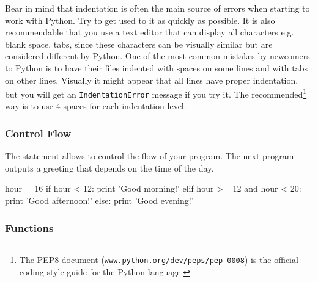 \noindent Bear in mind that indentation is often the main source of errors when starting to work with Python. Try to get used to it as quickly as possible. It is also recommendable that you use a text editor that can display all characters e.g. blank space, tabs, since these characters can be visually similar but are considered different by Python. One of the most common mistakes by newcomers to Python is to have their files indented with spaces on some lines and with tabs on other lines. Visually it might appear that all lines have proper indentation, but you will get an \texttt{IndentationError} message if you try it. The recommended\footnote{The PEP8 document (\texttt{www.python.org/dev/peps/pep-0008}) is the official coding style guide for the Python language.} way is to use 4 spaces for each indentation level.



\subsubsection{Control Flow}

The  statement allows to control the flow of your program. The next program outputs a greeting that depends on the time of the day.

\begin{python}
hour = 16
if hour < 12:
    print 'Good morning!'
elif hour >= 12 and hour < 20:
    print 'Good afternoon!'
else:
    print 'Good evening!'
\end{python}

 
\subsubsection{Functions}

